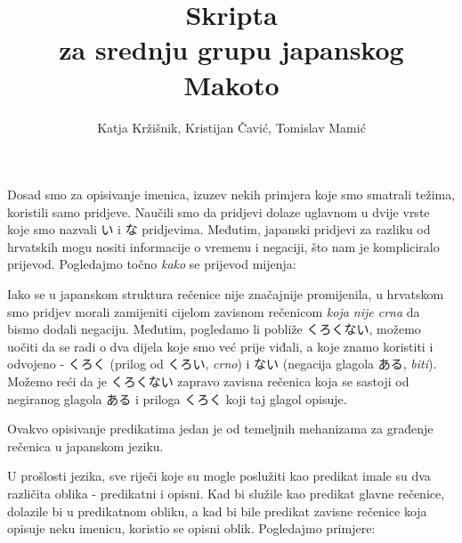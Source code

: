
\usepackage{tikz}
\title{Skripta\\
\large za srednju grupu japanskog\\
Makoto}
\author{Katja Kržišnik, Kristijan Čavić, Tomislav Mamić}


{\let\cleardoublepage\clearpage
\maketitle
\tableofcontents}
\newpage
{}

	
	
	Dosad smo za opisivanje imenica, izuzev nekih primjera koje smo smatrali težima, koristili samo pridjeve. Naučili smo da pridjevi dolaze uglavnom u dvije vrste koje smo nazvali い i な pridjevima\footnotemark[1]. Međutim, japanski pridjevi za razliku od hrvatskih mogu nositi informacije o vremenu i negaciji, što nam je kompliciralo prijevod. Pogledajmo točno \textit{kako} se prijevod mijenja:
	
	\begin{reibun}
	\end{reibun}
	
	Iako se u japanskom struktura rečenice nije značajnije promijenila, u hrvatskom smo pridjev morali zamijeniti cijelom zavisnom rečenicom \textit{koja nije crna} da bismo dodali negaciju. Međutim, pogledamo li pobliže くろくない, možemo uočiti da se radi o dva dijela koje smo već prije viđali, a koje znamo koristiti i odvojeno - くろく (prilog od くろい, \textit{crno}) i ない (negacija glagola ある, \textit{biti}). Možemo reći da je くろくない zapravo zavisna rečenica koja se sastoji od negiranog glagola ある i priloga くろく koji taj glagol opisuje.
	
	Ovakvo opisivanje predikatima jedan je od temeljnih mehanizama za građenje rečenica u japanskom jeziku.
	
	
	
	U prošlosti jezika, sve riječi koje su mogle poslužiti kao predikat imale su dva različita oblika - predikatni i opisni\footnotemark[2]. Kad bi služile kao predikat glavne rečenice, dolazile bi u predikatnom obliku, a kad bi bile predikat zavisne rečenice koja opisuje neku imenicu, koristio se opisni oblik. Pogledajmo primjere:

